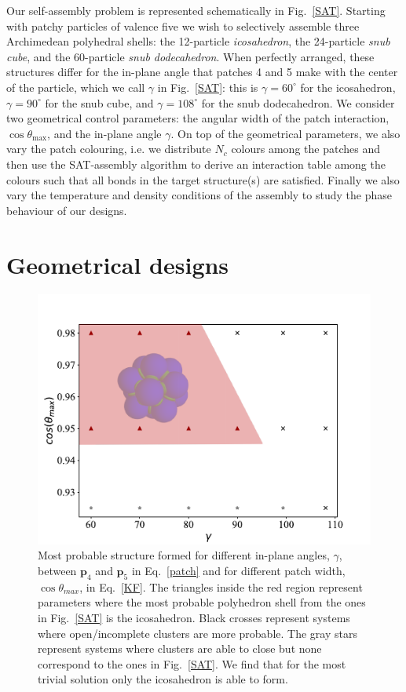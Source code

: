 \documentclass[a4paper, amsfonts, amssymb, amsmath, reprint, showkeys, nofootinbib, oneside]{revtex4-1}
\begin{document}
Our self-assembly problem is represented schematically in Fig.~\ref{SAT}. Starting with patchy particles of valence five we wish to selectively assemble three Archimedean polyhedral shells: the 12-particle \emph{icosahedron}, the 24-particle \emph{snub cube}, and the 60-particle \emph{snub dodecahedron}. When perfectly arranged, these structures differ for the in-plane angle that patches 4 and 5 make with the center of the particle, which we call $\gamma$ in Fig.~\ref{SAT}: this is $\gamma=60^\circ$ for the icosahedron, $\gamma=90^\circ$ for the snub cube, and  $\gamma=108^\circ$ for the snub dodecahedron. We consider two geometrical control parameters: the angular width of the patch interaction, $\cos\theta_\text{max}$, and the in-plane angle $\gamma$. On top of the geometrical parameters, we also vary the patch colouring, i.e. we distribute $N_c$ colours among the patches and then use the SAT-assembly algorithm to derive an interaction table among the colours such that all bonds in the target structure(s) are satisfied. Finally we also vary the temperature and density conditions of the assembly to study the phase behaviour of our designs.


\section{Geometrical designs}


\begin{figure}[t]
	\includegraphics{fig2.pdf}
	\caption{\label{N1c1} Most probable structure formed for different in-plane angles, $\gamma$, between $\textbf{p}_4$ and $\textbf{p}_5$ in Eq.~\ref{patch} and for different patch width, $\cos\theta_{max}$, in Eq.~\ref{KF}. The triangles inside the red region represent parameters where the most probable polyhedron shell from the ones in Fig.~\ref{SAT} is the icosahedron. Black crosses represent systems where open/incomplete clusters are more probable. The gray stars represent systems where clusters are able to close but none correspond to the ones in Fig.~\ref{SAT}. We find that for the most trivial solution only the icosahedron is able to form.}
\end{figure}
\end{document}
